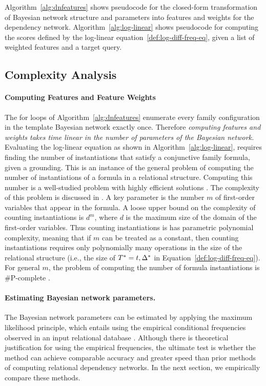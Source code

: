 \documentclass[runningheads,a4paper]{llncs}
\renewcommand{\Qconj}{\Appendterm{\FG{\TT} = \TV} {\QC}} %
\begin{document}
Algorithm~\ref{alg:dnfeatures} shows pseudocode for the closed-form transformation of Bayesian network structure and parameters into features and weights for the dependency network. Algorithm~\ref{alg:log-linear} shows pseudocode for computing the scores defined by the log-linear equation~\ref{def:log-diff-freq-eq}, given a list of weighted features and a target query.

\subsection{Complexity Analysis}

\paragraph{Computing Features and Feature Weights} The for loops of Algorithm~\ref{alg:dnfeatures} enumerate every family configuration in the template Bayesian network exactly once. Therefore {\em computing features and weights takes time linear in the number of parameters of the Bayesian network.} Evaluating the log-linear equation as shown in Algorithm~\ref{alg:log-linear}, requires finding the number of instantiations that satisfy a conjunctive family formula, given a grounding. This is an instance of the general problem of computing the number of instantiations of a formula in a relational structure. Computing this number is a well-studied problem  with highly efficient solutions \cite{Vardi1995,Schulte2014}.  
The complexity of this problem is discussed in \cite{Schulte2014}. 
A key parameter is the number $m$ of first-order variables that appear in the formula. A loose upper bound on the complexity of counting instantiations is $d^{m}$, where $d$ is the maximum size of the domain of the first-order variables. Thus counting instantiations is has parametric polynomial complexity, meaning that if $m$ can be treated as a constant, then counting instantiations requires only polynomially many operations in the size of the relational structure (i.e., the size of $\Qconj$ in Equation~\ref{def:log-diff-freq-eq}). For general $m$, the problem of computing the number of formula instantiations is \#P-complete \cite[Prop.12.4]{Domingos2007}.

\paragraph{Estimating Bayesian network parameters.}
The Bayesian network parameters can be estimated by applying the maximum likelihood principle, which entails using the empirical conditional frequencies observed in an input relational database \cite{Schulte2011,Schulte2014}. 
 Although there is theoretical justification for using the empirical frequencies, the ultimate test is whether the method can achieve comparable accuracy and greater speed than prior methods of computing relational dependency networks. In the next section, we empirically compare these methods.
 
\end{document}
